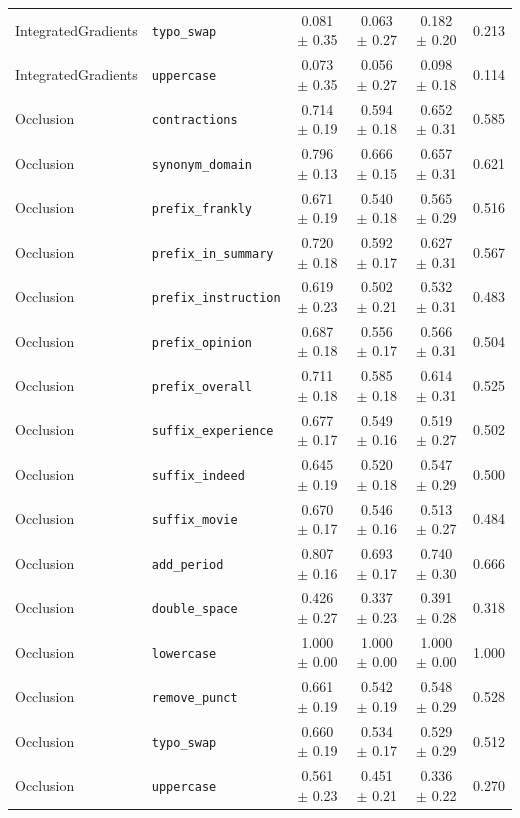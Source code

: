 \begin{table}[htbp]
\begin{tabular}{llcccc}
IntegratedGradients & \texttt{typo\_swap} & 0.081 $\pm$ 0.35 & 0.063 $\pm$ 0.27 & 0.182 $\pm$ 0.20 & 0.213 \\
IntegratedGradients & \texttt{uppercase} & 0.073 $\pm$ 0.35 & 0.056 $\pm$ 0.27 & 0.098 $\pm$ 0.18 & 0.114 \\
\hline
Occlusion & \texttt{contractions} & 0.714 $\pm$ 0.19 & 0.594 $\pm$ 0.18 & 0.652 $\pm$ 0.31 & 0.585 \\
Occlusion & \texttt{synonym\_domain} & 0.796 $\pm$ 0.13 & 0.666 $\pm$ 0.15 & 0.657 $\pm$ 0.31 & 0.621 \\
Occlusion & \texttt{prefix\_frankly} & 0.671 $\pm$ 0.19 & 0.540 $\pm$ 0.18 & 0.565 $\pm$ 0.29 & 0.516 \\
Occlusion & \texttt{prefix\_in\_summary} & 0.720 $\pm$ 0.18 & 0.592 $\pm$ 0.17 & 0.627 $\pm$ 0.31 & 0.567 \\
Occlusion & \texttt{prefix\_instruction} & 0.619 $\pm$ 0.23 & 0.502 $\pm$ 0.21 & 0.532 $\pm$ 0.31 & 0.483 \\
Occlusion & \texttt{prefix\_opinion} & 0.687 $\pm$ 0.18 & 0.556 $\pm$ 0.17 & 0.566 $\pm$ 0.31 & 0.504 \\
Occlusion & \texttt{prefix\_overall} & 0.711 $\pm$ 0.18 & 0.585 $\pm$ 0.18 & 0.614 $\pm$ 0.31 & 0.525 \\
Occlusion & \texttt{suffix\_experience} & 0.677 $\pm$ 0.17 & 0.549 $\pm$ 0.16 & 0.519 $\pm$ 0.27 & 0.502 \\
Occlusion & \texttt{suffix\_indeed} & 0.645 $\pm$ 0.19 & 0.520 $\pm$ 0.18 & 0.547 $\pm$ 0.29 & 0.500 \\
Occlusion & \texttt{suffix\_movie} & 0.670 $\pm$ 0.17 & 0.546 $\pm$ 0.16 & 0.513 $\pm$ 0.27 & 0.484 \\
Occlusion & \texttt{add\_period} & 0.807 $\pm$ 0.16 & 0.693 $\pm$ 0.17 & 0.740 $\pm$ 0.30 & 0.666 \\
Occlusion & \texttt{double\_space} & 0.426 $\pm$ 0.27 & 0.337 $\pm$ 0.23 & 0.391 $\pm$ 0.28 & 0.318 \\
Occlusion & \texttt{lowercase} & 1.000 $\pm$ 0.00 & 1.000 $\pm$ 0.00 & 1.000 $\pm$ 0.00 & 1.000 \\
Occlusion & \texttt{remove\_punct} & 0.661 $\pm$ 0.19 & 0.542 $\pm$ 0.19 & 0.548 $\pm$ 0.29 & 0.528 \\
Occlusion & \texttt{typo\_swap} & 0.660 $\pm$ 0.19 & 0.534 $\pm$ 0.17 & 0.529 $\pm$ 0.29 & 0.512 \\
Occlusion & \texttt{uppercase} & 0.561 $\pm$ 0.23 & 0.451 $\pm$ 0.21 & 0.336 $\pm$ 0.22 & 0.270 \\

\end{tabular}
\end{table}

